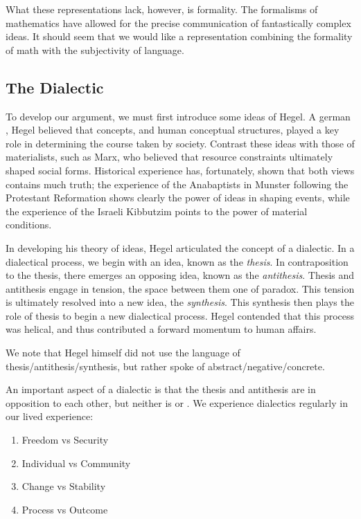 What these representations lack, however, is formality.
The formalisms of mathematics have allowed for the precise communication of fantastically complex ideas.
It should seem that we would like a representation combining the formality of math with the subjectivity of language.


\subsection{The Dialectic}

To develop our argument, we must first introduce some ideas of Hegel.
A german , Hegel believed that concepts, and human conceptual structures, played a key role in determining the course taken by society.
Contrast these ideas with those of materialists, such as Marx, who believed that resource constraints ultimately shaped social forms.
Historical experience has, fortunately, shown that both views contains much truth; the experience of the Anabaptists in Munster following the Protestant Reformation\cite{carlin} shows clearly the power of ideas in shaping events, while the experience of the Israeli Kibbutzim points to the power of material conditions.

In developing his theory of ideas, Hegel articulated the concept of a dialectic.
In a dialectical process, we begin with an idea, known as the \textit{thesis}.
In contraposition to the thesis, there emerges an opposing idea, known as the \textit{antithesis}.
Thesis and antithesis engage in tension, the space between them one of paradox.
This tension is ultimately resolved into a new idea, the \textit{synthesis}.
This synthesis then plays the role of thesis to begin a new dialectical process.
Hegel contended that this process was helical, and thus contributed a forward momentum to human affairs.

We note that Hegel himself did not use the language of thesis/antithesis/synthesis, but rather spoke of abstract/negative/concrete.

An important aspect of a dialectic is that the thesis and antithesis are in opposition to each other, but neither is  or .
We experience dialectics regularly in our lived experience:

\begin{enumerate}
  \item Freedom vs Security
  \item Individual vs Community
  \item Change vs Stability
  \item Process vs Outcome
\end{enumerate}

